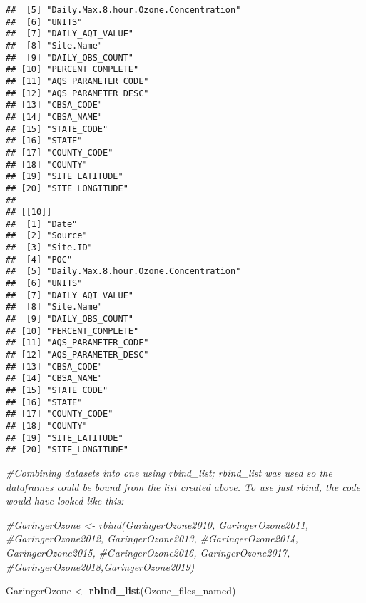 \documentclass[]{article}
\newenvironment{Shaded}{\begin{snugshade}}{\end{snugshade}}
\newcommand{\CommentTok}[1]{\textcolor[rgb]{0.56,0.35,0.01}{\textit{#1}}}
\newcommand{\KeywordTok}[1]{\textcolor[rgb]{0.13,0.29,0.53}{\textbf{#1}}}
\newcommand{\NormalTok}[1]{#1}
\newcommand{\StringTok}[1]{\textcolor[rgb]{0.31,0.60,0.02}{#1}}
\begin{document}
\begin{verbatim}
##  [5] "Daily.Max.8.hour.Ozone.Concentration"
##  [6] "UNITS"                               
##  [7] "DAILY_AQI_VALUE"                     
##  [8] "Site.Name"                           
##  [9] "DAILY_OBS_COUNT"                     
## [10] "PERCENT_COMPLETE"                    
## [11] "AQS_PARAMETER_CODE"                  
## [12] "AQS_PARAMETER_DESC"                  
## [13] "CBSA_CODE"                           
## [14] "CBSA_NAME"                           
## [15] "STATE_CODE"                          
## [16] "STATE"                               
## [17] "COUNTY_CODE"                         
## [18] "COUNTY"                              
## [19] "SITE_LATITUDE"                       
## [20] "SITE_LONGITUDE"                      
## 
## [[10]]
##  [1] "Date"                                
##  [2] "Source"                              
##  [3] "Site.ID"                             
##  [4] "POC"                                 
##  [5] "Daily.Max.8.hour.Ozone.Concentration"
##  [6] "UNITS"                               
##  [7] "DAILY_AQI_VALUE"                     
##  [8] "Site.Name"                           
##  [9] "DAILY_OBS_COUNT"                     
## [10] "PERCENT_COMPLETE"                    
## [11] "AQS_PARAMETER_CODE"                  
## [12] "AQS_PARAMETER_DESC"                  
## [13] "CBSA_CODE"                           
## [14] "CBSA_NAME"                           
## [15] "STATE_CODE"                          
## [16] "STATE"                               
## [17] "COUNTY_CODE"                         
## [18] "COUNTY"                              
## [19] "SITE_LATITUDE"                       
## [20] "SITE_LONGITUDE"
\end{verbatim}

\begin{Shaded}
\begin{Highlighting}[]
\CommentTok{#Combining datasets into one using rbind_list; rbind_list was used so the dataframes could be bound from the list created above. To use just rbind, the code would have looked like this:}

\CommentTok{#GaringerOzone <- rbind(GaringerOzone2010, GaringerOzone2011, }
                            \CommentTok{#GaringerOzone2012, GaringerOzone2013,}
                            \CommentTok{#GaringerOzone2014, GaringerOzone2015,}
                            \CommentTok{#GaringerOzone2016, GaringerOzone2017,}
                            \CommentTok{#GaringerOzone2018,GaringerOzone2019)}

\NormalTok{GaringerOzone <-}\StringTok{ }\KeywordTok{rbind_list}\NormalTok{(Ozone_files_named)}
\end{Highlighting}
\end{Shaded}
\end{document}
